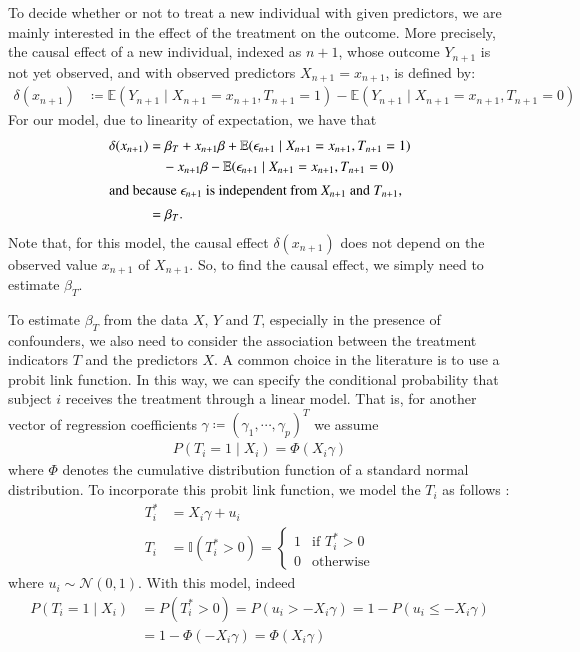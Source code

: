 \documentclass[preprint,12pt]{elsarticle}
\begin{document}
To decide whether or not to treat a new individual with given predictors,
we are mainly interested in the effect of the treatment on the outcome.
More precisely, the causal effect of a new individual, indexed as $n+1$,
whose outcome $Y_{n+1}$ is not yet observed, and with observed predictors $X_{n+1}=x_{n+1}$, is defined by:
\begin{align}
  \delta(x_{n+1})
  &\coloneqq\mathbb{E}(Y_{n+1}\mid X_{n+1}=x_{n+1},T_{n+1} =1) - \mathbb{E}(Y_{n+1}\mid X_{n+1}=x_{n+1},T_{n+1}=0)
\end{align}
For our model, due to linearity of expectation, we have that
\begin{align}
  \delta(x_{n+1})
  &=\beta_T+x_{n+1}\beta+\mathbb{E}(\epsilon_{n+1}\mid X_{n+1}=x_{n+1},T_{n+1} =1) \\
  &\quad - x_{n+1}\beta-\mathbb{E}(\epsilon_{n+1}\mid X_{n+1}=x_{n+1},T_{n+1} =0)\\
  \intertext{and because $\epsilon_{n+1}$ is independent from $X_{n+1}$ and $T_{n+1}$,}
  &=\beta_{T}.
\end{align}
Note that, for this model, the causal effect $\delta(x_{n+1})$
does not depend on the observed value $x_{n+1}$ of $X_{n+1}$.
So, to find the causal effect, we simply need to estimate $\beta_T$.

To estimate $\beta_T$ from the data $X$, $Y$ and $T$,
especially in the presence of confounders,
we also need to consider the
association between the treatment indicators $T$ and the predictors $X$.
A common choice in the literature is to use a probit link function.
In this way, we can
specify the conditional probability that subject $i$ receives the treatment through a linear model. 
That is, for another vector of regression coefficients 
$\gamma\coloneqq(\gamma_1, \cdots, \gamma_p)^T$ we
assume
\begin{align}
	P(T_i=1\mid X_i) = \Phi(X_i\gamma)
\end{align}
where $\Phi$ denotes the cumulative distribution function
of a standard normal distribution. To incorporate this probit
link function, we model the $T_i$ as follows \citep{albert93}:
\begin{align}
    T_i^* &= X_i\gamma +u_i \\
    T_i   &= \mathbb{I}(T_i^*>0)
    =
    \begin{cases}
    1 & \text{if }T_i^*>0 \\
    0 & \text{otherwise}
    \end{cases}
\end{align}
where $u_i\sim\mathcal{N}(0,1)$.
With this model, indeed
\begin{align}
  P(T_i=1\mid X_i)
  &=P(T_i^*>0)=P(u_i>-X_i\gamma)=1-P(u_i\le -X_i\gamma) \\
  &=1-\Phi(-X_i\gamma)=\Phi(X_i\gamma)
\end{align}
\end{document}
